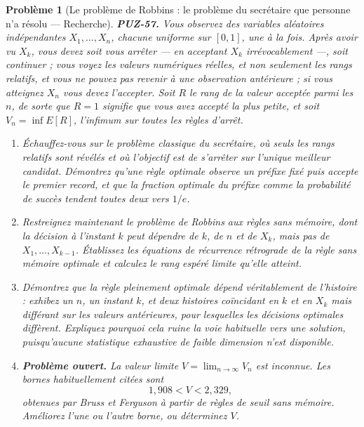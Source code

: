 \documentclass[11pt]{article}
\newtheorem{problem}{Problème}
\begin{document}
\begin{problem}[{Le problème de Robbins : le problème du secrétaire que personne n'a résolu --- Recherche}]
\textbf{PUZ-57.} Vous observez des variables aléatoires indépendantes
$ X_1, \dots, X_n $, chacune uniforme sur $ [0,1] $, une à la fois. Après avoir vu
$ X_k $, vous devez soit vous arrêter --- en acceptant $ X_k $ irrévocablement ---, soit
continuer ; vous voyez les valeurs numériques réelles, et non seulement les rangs relatifs, et
vous ne pouvez pas revenir à une observation antérieure ; si vous atteignez $ X_n $ vous
devez l'accepter. Soit $ R $ le rang de la valeur acceptée parmi les $ n $, de sorte que
$ R = 1 $ signifie que vous avez accepté la plus petite, et soit $ V_n = \inf E[R] $,
l'infimum sur toutes les règles d'arrêt.
\begin{enumerate}
\item[(a)] Échauffez-vous sur le problème classique du secrétaire, où seuls les rangs relatifs sont
révélés et où l'objectif est de s'arrêter sur l'unique meilleur candidat. Démontrez qu'une
règle optimale observe un préfixe fixé puis accepte le premier record, et que la fraction
optimale du préfixe comme la probabilité de succès tendent toutes deux vers $ 1/e $.
\item[(b)] Restreignez maintenant le problème de Robbins aux règles \textit{sans mémoire}, dont la
décision à l'instant $ k $ peut dépendre de $ k $, de $ n $ et de $ X_k $, mais pas de
$ X_1, \dots, X_{k-1} $. Établissez les équations de récurrence rétrograde de la règle sans
mémoire optimale et calculez le rang espéré limite qu'elle atteint.
\item[(c)] Démontrez que la règle pleinement optimale dépend véritablement de l'histoire : exhibez un
$ n $, un instant $ k $, et deux histoires coïncidant en $ k $ et en $ X_k $ mais
différant sur les valeurs antérieures, pour lesquelles les décisions optimales diffèrent.
Expliquez pourquoi cela ruine la voie habituelle vers une solution, puisqu'aucune statistique
exhaustive de faible dimension n'est disponible.
\item[(d)] \textbf{Problème ouvert.} La valeur limite $ V = \lim_{n \to \infty} V_n $ est inconnue.
Les bornes habituellement citées sont
\[ 1{,}908 < V < 2{,}329 , \]
obtenues par Bruss et Ferguson à partir de règles de seuil sans mémoire. Améliorez l'une ou
l'autre borne, ou déterminez $ V $.
\end{enumerate}

\end{problem}
\end{document}
